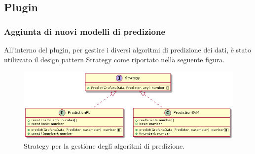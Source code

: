 \documentclass[../manuale-sviluppatore.tex]{subfiles}
\begin{document}
\subsection{Plugin}

\subsubsection{Aggiunta di nuovi modelli di predizione}
All'interno del plugin, per gestire i diversi algoritmi di predizione dei dati, è stato utilizzato il design pattern Strategy come riportato nella seguente figura.

\begin{figure}[H]
  \centering
  \includegraphics[width=15cm]{img/plugin/strategy.png}
  \caption{Strategy per la gestione degli algoritmi di predizione.}
\end{figure}
\end{document}
